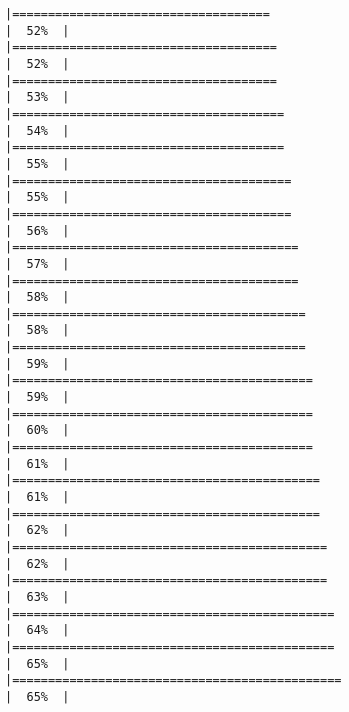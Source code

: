 \documentclass[
]{article}
\begin{document}
\begin{verbatim}
|====================================                                  |  52%  |                                                                              |=====================================                                 |  52%  |                                                                              |=====================================                                 |  53%  |                                                                              |======================================                                |  54%  |                                                                              |======================================                                |  55%  |                                                                              |=======================================                               |  55%  |                                                                              |=======================================                               |  56%  |                                                                              |========================================                              |  57%  |                                                                              |========================================                              |  58%  |                                                                              |=========================================                             |  58%  |                                                                              |=========================================                             |  59%  |                                                                              |==========================================                            |  59%  |                                                                              |==========================================                            |  60%  |                                                                              |==========================================                            |  61%  |                                                                              |===========================================                           |  61%  |                                                                              |===========================================                           |  62%  |                                                                              |============================================                          |  62%  |                                                                              |============================================                          |  63%  |                                                                              |=============================================                         |  64%  |                                                                              |=============================================                         |  65%  |                                                                              |==============================================                        |  65%  |                                                                              
\end{verbatim}
\end{document}
